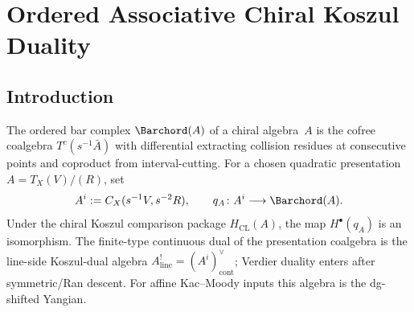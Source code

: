 
\providecommand{\Assch}{\mathrm{Ass}^{\mathrm{ch}}}
\providecommand{\Barch}{\overline{B}^{\mathrm{ch}}}
\providecommand{\Cobar}{\Omega^{\mathrm{ch}}}
\providecommand{\coHoch}{\operatorname{coHH}}
\providecommand{\Cotor}{\operatorname{Cotor}}
\providecommand{\Coext}{\operatorname{Coext}}
\providecommand{\RHom}{R\!\operatorname{Hom}}
\providecommand{\Tot}{\operatorname{Tot}}
\providecommand{\KK}{\mathbb{K}}
\providecommand{\Dpbw}{D^{\mathrm{pbw}}}
\providecommand{\Dco}{D^{\mathrm{co}}}
\providecommand{\chotimes}{\mathbin{\otimes^{\mathrm{ch}}}}
\providecommand{\wt}{\widetilde}
\providecommand{\eps}{\varepsilon}
\providecommand{\susp}{s}
\providecommand{\coeq}{\operatorname{coeq}}
\providecommand{\id}{\mathrm{id}}
\providecommand{\op}{\mathrm{op}}
\providecommand{\cop}{\mathrm{cop}}
\providecommand{\HH}{\operatorname{HH}}
\providecommand{\Tor}{\operatorname{Tor}}
\providecommand{\Ext}{\operatorname{Ext}}
\providecommand{\gr}{\operatorname{gr}}
\providecommand{\MC}{\operatorname{MC}}
\providecommand{\Ob}{\operatorname{Ob}}
\providecommand{\eq}{\operatorname{eq}}
\providecommand{\Eone}{\mathsf{E}_1}
\providecommand{\Einf}{\mathsf{E}_{\infty}}
\providecommand{\Vlat}{V}
\providecommand{\barBgeom}{\bar{\mathbf{B}}}

\chapter{Ordered Associative Chiral Koszul Duality}
\label{ch:ordered-associative-chiral-kd}

\section{Introduction}

The ordered bar complex $\Barchord(A)$ of a chiral algebra~$A$
is the cofree coalgebra $T^c(s^{-1}\bar{A})$ with differential extracting
collision residues at consecutive points and coproduct from interval-cutting.
For a chosen quadratic presentation $A=T_X(V)/(R)$, set
\[
 A^i:=C_X(s^{-1}V,s^{-2}R),
 \qquad
 q_A\colon A^i\longrightarrow\Barchord(A).
\]
Under the chiral Koszul comparison package $H_{\mathrm{CL}}(A)$, the
map $H^\bullet(q_A)$ is an isomorphism.  The finite-type continuous
dual of the presentation coalgebra is the line-side Koszul-dual algebra
$A^!_{\mathrm{line}}=(A^i)^\vee_{\mathrm{cont}}$; Verdier duality
enters after symmetric/Ran descent.
For affine Kac--Moody inputs this algebra is the dg-shifted Yangian.

